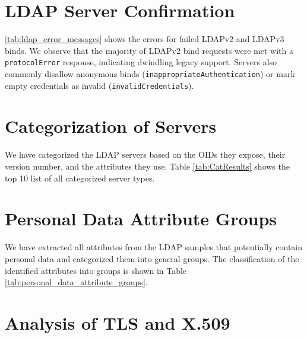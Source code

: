 \section{LDAP Server Confirmation}
\label{appendix:ldap_server_confirmation}


\cref{tab:ldap_error_messages} shows the errors for failed LDAPv2 and LDAPv3 binds. We observe that the majority of LDAPv2 bind requests were met with a \texttt{protocolError} response, indicating dwindling legacy support. Servers also commonly disallow anonymous binds (\texttt{inappropriateAuthentication}) or mark empty credentials as invalid (\texttt{invalidCredentials}).


\section{Categorization of Servers}

We have categorized the LDAP servers based on the OIDs they expose, their version number, and the attributes they use. Table \ref{tab:CatResults} shows the top 10 list of all categorized server types.


\section{Personal Data Attribute Groups}
\label{appendix:attribute_anaylsis}
We have extracted all attributes from the LDAP samples that potentially contain personal data and categorized them into general groups. The classification of the identified attributes into groups is shown in Table \ref{tab:personal_data_attribute_groups}.




\section{Analysis of TLS and X.509}

\label{appendix:tls}






